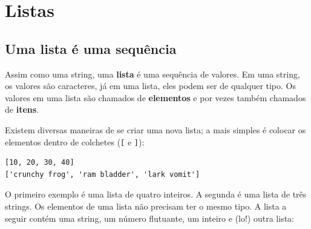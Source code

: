 
\chapter{Listas}


\section{Uma lista é uma sequência}

Assim como uma string, uma {\bf lista} é uma sequência de valores. Em
uma string, os valores são caracteres, já em uma lista, eles podem ser
de qualquer tipo. Os valores em uma lista são chamados de {\bf elementos}
e por vezes também chamados de {\bf itens}.



Existem diversas maneiras de se criar uma nova lista; a mais simples
é colocar os elementos dentro de colchetes (\verb"[" e \verb"]"):
 

\beforeverb
\begin{verbatim}
[10, 20, 30, 40]
['crunchy frog', 'ram bladder', 'lark vomit']
\end{verbatim}
\afterverb
%

O primeiro exemplo é uma lista de quatro inteiros. A segunda é uma lista
de três strings. Os elementos de uma lista não precisam ter o mesmo tipo.
A lista a seguir contém uma string, um número flutuante, um inteiro e (lo!)
outra lista:

